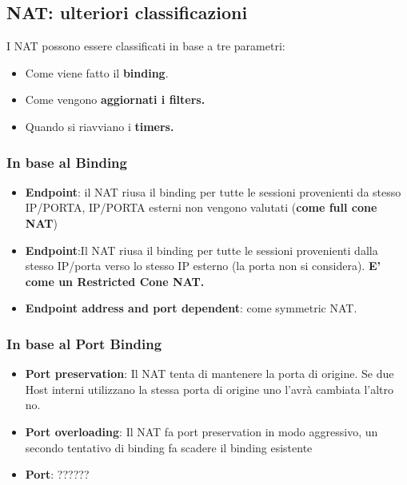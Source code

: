 \documentclass[12pt]{article}
\begin{document}
		\subsection{NAT: ulteriori classificazioni}
			I NAT possono essere classificati in base a tre parametri:
			\begin{itemize}
				\item Come viene fatto il \textbf{binding}.
				\item Come vengono \textbf{aggiornati i filters.}
				\item Quando si riavviano i \textbf{timers.}
			\end{itemize}
			\subsubsection{In base al Binding}
				\begin{itemize}
					\item \textbf{Endpoint}: il NAT riusa il binding per tutte le sessioni provenienti da stesso IP/PORTA, IP/PORTA esterni non vengono valutati (\textbf{come full cone NAT})
					\item \textbf{Endpoint}:Il NAT riusa il binding per tutte le sessioni provenienti dalla stesso IP/porta verso lo stesso IP esterno (la porta non si considera).
					\textbf{E’ come un Restricted Cone NAT.}
					\item \textbf{Endpoint address and port dependent}: come symmetric NAT.  	
				\end{itemize}
			\subsubsection{In base al Port Binding}
				\begin{itemize}
					\item \textbf{Port preservation}: Il NAT tenta di mantenere la porta di origine. Se due Host interni utilizzano la stessa porta di origine uno l'avrà cambiata l'altro no.
					\item \textbf{Port overloading}: Il NAT fa port preservation in modo aggressivo, un secondo tentativo di binding fa scadere il binding esistente
					\item \textbf{Port}: ??????
				\end{itemize}
\end{document}
